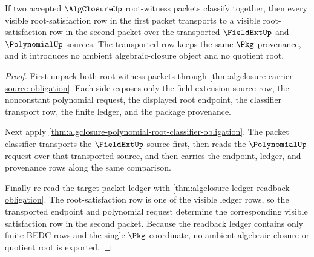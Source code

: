 \begin{theorem}
\label{thm:algclosure-root-witness-transport-coverage}
If two accepted $\AlgClosureUp$ root-witness packets classify together, then
every visible root-satisfaction row in the first packet transports to a
visible root-satisfaction row in the second packet over the transported
$\FieldExtUp$ and $\PolynomialUp$ sources. The transported row keeps the same
$\Pkg$ provenance, and it introduces no ambient algebraic-closure object and
no quotient root.
\end{theorem}
\begin{proof}
First unpack both root-witness packets through
\autoref{thm:algclosure-carrier-source-obligation}. Each side exposes only the
field-extension source row, the nonconstant polynomial request, the displayed
root endpoint, the classifier transport row, the finite ledger, and the
package provenance.

Next apply
\autoref{thm:algclosure-polynomial-root-classifier-obligation}. The packet
classifier transports the $\FieldExtUp$ source first, then reads the
$\PolynomialUp$ request over that transported source, and then carries the
endpoint, ledger, and provenance rows along the same comparison.

Finally re-read the target packet ledger with
\autoref{thm:algclosure-ledger-readback-obligation}. The root-satisfaction row
is one of the visible ledger rows, so the transported endpoint and polynomial
request determine the corresponding visible satisfaction row in the second
packet. Because the readback ledger contains only finite BEDC rows and the
single $\Pkg$ coordinate, no ambient algebraic closure or quotient root is
exported.
\end{proof}

